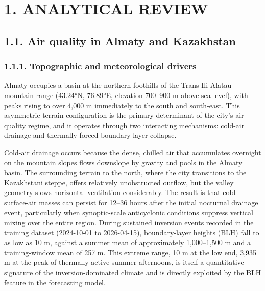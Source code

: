 \section{1. ANALYTICAL REVIEW}\label{analytical-review}

\subsection{1.1. Air quality in Almaty and Kazakhstan}\label{air-quality-in-almaty-and-kazakhstan}

\subsubsection{1.1.1. Topographic and meteorological drivers}\label{topographic-and-meteorological-drivers}

Almaty occupies a basin at the northern foothills of the Trans-Ili Alatau mountain range (43.24°N, 76.89°E, elevation 700--900 m above sea level), with peaks rising to over 4,000 m immediately to the south and south-east. This asymmetric terrain configuration is the primary determinant of the city's air quality regime, and it operates through two interacting mechanisms: cold-air drainage and thermally forced boundary-layer collapse.

Cold-air drainage occurs because the dense, chilled air that accumulates overnight on the mountain slopes flows downslope by gravity and pools in the Almaty basin. The surrounding terrain to the north, where the city transitions to the Kazakhstani steppe, offers relatively unobstructed outflow, but the valley geometry slows horizontal ventilation considerably. The result is that cold surface-air masses can persist for 12--36 hours after the initial nocturnal drainage event, particularly when synoptic-scale anticyclonic conditions suppress vertical mixing over the entire region. During sustained inversion events recorded in the training dataset (2024-10-01 to 2026-04-15), boundary-layer heights (BLH) fall to as low as 10 m, against a summer mean of approximately 1,000--1,500 m and a training-window mean of 257 m. This extreme range, 10 m at the low end, 3,935 m at the peak of thermally active summer afternoons, is itself a quantitative signature of the inversion-dominated climate and is directly exploited by the BLH feature in the forecasting model.

